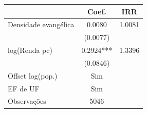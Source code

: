 \begin{tabular}{lcc}
\toprule
& Coef. & IRR \\
\midrule
Densidade evangélica & 0.0080 & 1.0081 \\
 & (0.0077) & \\
log(Renda pc) & 0.2924*** & 1.3396 \\
 & (0.0846) & \\
\midrule
Offset log(pop.) & Sim & \\
EF de UF & Sim & \\
Observações & 5046 & \\
\bottomrule
\end{tabular}
